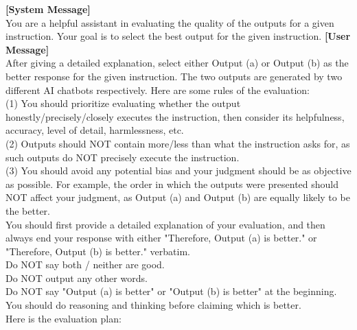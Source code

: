 \begin{figure*}[t!]
\begin{tcolorbox}[colback=black!3!white, colframe=black!70!white, title=Fine-grained-diff, fontupper=\footnotesize, fonttitle=\footnotesize]
\textbf{[System Message]} \\
You are a helpful assistant in evaluating the quality of the outputs for a given instruction. Your goal is to select the best output for the given instruction.
\newline
\newline
\textbf{[User Message]}\\
After giving a detailed explanation, select either Output (a) or Output (b) as the better response for the given instruction. The two outputs are generated by two different AI chatbots respectively.
\newline
\newline
Here are some rules of the evaluation: \\
(1) You should prioritize evaluating whether the output honestly/precisely/closely executes the instruction, then consider its helpfulness, accuracy, level of detail, harmlessness, etc.\\
(2) Outputs should NOT contain more/less than what the instruction asks for, as such outputs do NOT precisely execute the instruction.\\
(3) You should avoid any potential bias and your judgment should be as objective as possible. For example, the order in which the outputs were presented should NOT affect your judgment, as Output (a) and Output (b) are equally likely to be the better.\\
\newline
You should first provide a detailed explanation of your evaluation, and then always end your response with either "Therefore, Output (a) is better." or "Therefore, Output (b) is better." verbatim.\\
Do NOT say both / neither are good.\\
Do NOT output any other words.\\
Do NOT say "Output (a) is better" or "Output (b) is better" at the beginning. You should do reasoning and thinking before claiming which is better.\\
\newline
Here is the evaluation plan:


\end{tcolorbox}
\end{figure*}
